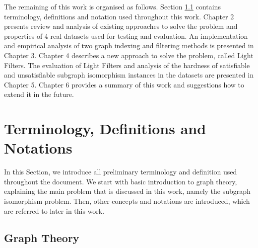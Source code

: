 \documentclass{l4proj}
\begin{document}
        

The remaining of this work is organised as follows. Section \ref{sec:graphTheory} contains terminology, definitions and notation used throughout this work. Chapter 2 presents review and analysis of existing approaches to solve the problem and properties of 4 real datasets used for testing and evaluation. An implementation and empirical analysis of two graph indexing and filtering methods is presented in Chapter 3. Chapter 4 describes a new approach to solve the problem, called Light Filters. The evaluation of Light Filters and analysis of the hardness of satisfiable and unsatisfiable subgraph isomorphism instances in the datasets are presented in Chapter 5. Chapter 6 provides a summary of this work and suggestions how to extend it in the future. 

\section{Terminology, Definitions and Notations}
\label{sec:theory}
In this Section, we introduce all preliminary terminology and definition used throughout the document. We start with basic introduction to graph theory, explaining the main problem that is discussed in this work, namely the subgraph isomorphism problem. Then, other concepts and notations are introduced, which are referred to later in this work.

\subsection{Graph Theory}
\label{sec:graphTheory}
\end{document}

